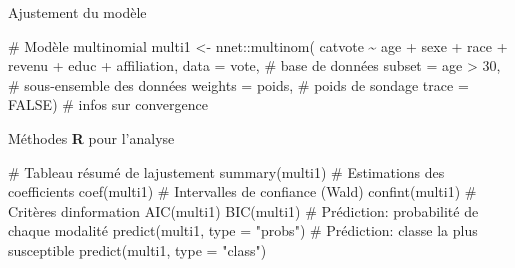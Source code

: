 \documentclass[
  ignorenonframetext,
]{beamer}
\newenvironment{Shaded}{\begin{snugshade}}{\end{snugshade}}
\newcommand{\AttributeTok}[1]{\textcolor[rgb]{0.40,0.45,0.13}{#1}}
\newcommand{\CommentTok}[1]{\textcolor[rgb]{0.37,0.37,0.37}{#1}}
\newcommand{\ConstantTok}[1]{\textcolor[rgb]{0.56,0.35,0.01}{#1}}
\newcommand{\DecValTok}[1]{\textcolor[rgb]{0.68,0.00,0.00}{#1}}
\newcommand{\FunctionTok}[1]{\textcolor[rgb]{0.28,0.35,0.67}{#1}}
\newcommand{\NormalTok}[1]{\textcolor[rgb]{0.00,0.23,0.31}{#1}}
\newcommand{\OtherTok}[1]{\textcolor[rgb]{0.00,0.23,0.31}{#1}}
\newcommand{\SpecialCharTok}[1]{\textcolor[rgb]{0.37,0.37,0.37}{#1}}
\newcommand{\StringTok}[1]{\textcolor[rgb]{0.13,0.47,0.30}{#1}}
\begin{document}
\begin{frame}[fragile]{Ajustement du modèle}
\begin{Shaded}
\begin{Highlighting}[numbers=left,,]
\CommentTok{\# Modèle multinomial}
\NormalTok{multi1 }\OtherTok{\textless{}{-}}\NormalTok{ nnet}\SpecialCharTok{::}\FunctionTok{multinom}\NormalTok{(}
\NormalTok{  catvote }\SpecialCharTok{\textasciitilde{}}\NormalTok{ age }\SpecialCharTok{+}\NormalTok{ sexe }\SpecialCharTok{+}\NormalTok{ race }\SpecialCharTok{+}\NormalTok{ revenu }\SpecialCharTok{+} 
\NormalTok{    educ }\SpecialCharTok{+}\NormalTok{ affiliation, }
  \AttributeTok{data =}\NormalTok{ vote,       }\CommentTok{\# base de données}
  \AttributeTok{subset =}\NormalTok{ age }\SpecialCharTok{\textgreater{}} \DecValTok{30}\NormalTok{, }\CommentTok{\# sous{-}ensemble des données}
  \AttributeTok{weights =}\NormalTok{ poids,   }\CommentTok{\# poids de sondage}
  \AttributeTok{trace =} \ConstantTok{FALSE}\NormalTok{)     }\CommentTok{\# infos sur convergence}
\end{Highlighting}
\end{Shaded}
\end{frame}

\begin{frame}[fragile]{Méthodes \textbf{R} pour l'analyse}
\label{muxe9thodes-r-pour-lanalyse}
\begin{Shaded}
\begin{Highlighting}[numbers=left,,]
\CommentTok{\# Tableau résumé de l\textquotesingle{}ajustement}
\FunctionTok{summary}\NormalTok{(multi1)}
\CommentTok{\# Estimations des coefficients}
\FunctionTok{coef}\NormalTok{(multi1)}
\CommentTok{\# Intervalles de confiance (Wald)}
\FunctionTok{confint}\NormalTok{(multi1)}
\CommentTok{\# Critères d\textquotesingle{}information}
\FunctionTok{AIC}\NormalTok{(multi1)}
\FunctionTok{BIC}\NormalTok{(multi1)}
\CommentTok{\# Prédiction: probabilité de chaque modalité}
\FunctionTok{predict}\NormalTok{(multi1, }\AttributeTok{type =} \StringTok{"probs"}\NormalTok{)}
\CommentTok{\# Prédiction: classe la plus susceptible}
\FunctionTok{predict}\NormalTok{(multi1, }\AttributeTok{type =} \StringTok{"class"}\NormalTok{)}
\end{Highlighting}
\end{Shaded}
\end{frame}
\end{document}
